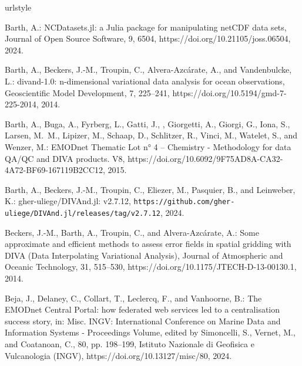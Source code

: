 \documentclass[essd, manuscript]{copernicus}
\begin{document}
\begin{thebibliography}{52}
\providecommand{\natexlab}[1]{#1}
\providecommand{\url}[1]{\texttt{#1}}
\providecommand{\urlprefix}{}
\expandafter\ifx\csname urlstyle\endcsname\relax
  \providecommand{\doi}[1]{https://doi.org/\discretionary{}{}{}#1}\else
  \providecommand{\doi}{https://doi.org/\discretionary{}{}{}\begingroup
  \urlstyle{rm}\Url}\fi

Barth, A.: NCDatasets.jl: a Julia package for manipulating netCDF data sets,
  Journal of Open Source Software, 9, 6504, \doi{10.21105/joss.06504}, 2024.

Barth, A., Beckers, J.-M., Troupin, C., Alvera-Azc\'arate, A., and
  Vandenbulcke, L.: divand-1.0: n-dimensional variational data analysis for
  ocean observations, Geoscientific Model Development, 7, 225--241,
  \doi{10.5194/gmd-7-225-2014}, 2014.

Barth, A., Buga, A., Fyrberg, L., Gatti, J., , Giorgetti, A., Giorgi, G., Iona,
  S., Larsen, M.~M., Lipizer, M., Schaap, D., Schlitzer, R., Vinci, M.,
  Watelet, S., and Wenzer, M.: EMODnet Thematic Lot n° 4 – Chemistry -
  Methodology for data QA/QC and DIVA products. V8,
  \doi{10.6092/9F75AD8A-CA32-4A72-BF69-167119B2CC12}, 2015.

Barth, A., Beckers, J.-M., Troupin, C., Eliezer, M., Pasquier, B., and
  Leinweber, K.: gher-uliege/DIVAnd.jl: v2.7.12,
  \urlprefix\url{https://github.com/gher-uliege/DIVAnd.jl/releases/tag/v2.7.12},
  2024.

Beckers, J.-M., Barth, A., Troupin, C., and Alvera-Azc\'{a}rate, A.: {Some
  approximate and efficient methods to assess error fields in spatial gridding
  with DIVA (Data Interpolating Variational Analysis)}, Journal of Atmospheric
  and Oceanic Technology, 31, 515--530, \doi{10.1175/JTECH-D-13-00130.1}, 2014.

Beja, J., Delaney, C., Collart, T., Leclercq, F., and Vanhoorne, B.: {The
  EMODnet Central Portal: how federated web services led to a centralisation
  success story}, in: {Misc. INGV: International Conference on Marine Data and
  Information Systems - Proceedings Volume}, edited by Simoncelli, S., Vernet,
  M., and Coatanoan, C., 80, pp. 198--199, Istituto Nazionale di Geofisica e
  Vulcanologia (INGV), \doi{10.13127/misc/80}, 2024.


\end{thebibliography}
\end{document}
